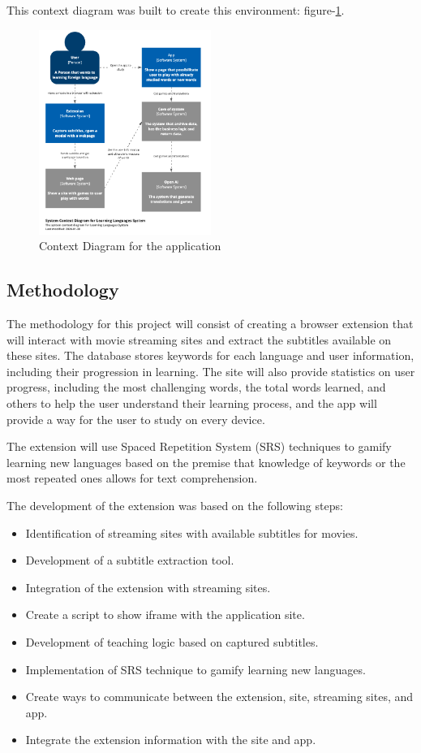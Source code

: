 \documentclass[12pt]{article}
\begin{document}
This context diagram was built to create this environment: figure-\ref{fig:context_diagram}.

\begin{figure}
\centering
\caption{
Context Diagram for the application
}
\label{fig:context_diagram}
\includegraphics[width=0.5\textwidth]{assets/4.png}
\end{figure}

\subsection{Methodology}
The methodology for this project will consist of creating a browser extension that will interact with movie streaming sites and extract the subtitles available on these sites. The database stores keywords for each language and user information, including their progression in learning. The site will also provide statistics on user progress, including the most challenging words, the total words learned, and others to help the user understand their learning process, and the app will provide a way for the user to study on every device.

The extension will use Spaced Repetition System (SRS) techniques to gamify learning new languages based on the premise that knowledge of keywords or the most repeated ones allows for text comprehension.

The development of the extension was based on the following steps:
\begin{itemize}
\item Identification of streaming sites with available subtitles for movies.
\item Development of a subtitle extraction tool.
\item Integration of the extension with streaming sites.
\item Create a script to show iframe with the application site.
\item Development of teaching logic based on captured subtitles.
\item Implementation of SRS technique to gamify learning new languages.
\item Create ways to communicate between the extension, site, streaming sites, and app.
\item Integrate the extension information with the site and app.
\end{itemize}
\end{document}

